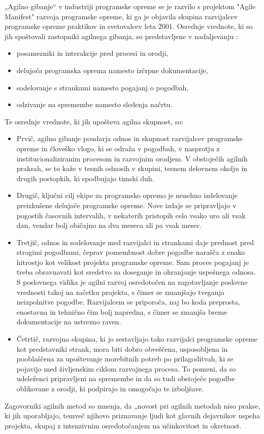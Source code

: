 \documentclass[a4paper,12pt,openright]{book}
\begin{document}
„Agilno gibanje“ v industriji programske opreme se je razvilo s projektom "Agile Manifest" razvoja programske opreme, ki ga je objavila skupina razvijalcev programske opreme praktikov in svetovalcev leta 2001. Osrednje vrednote, ki so jih spoštovali zastopniki agilnega gibanja, so predstavljene v nadaljevanju \cite{highsmith2009agile}:
\begin{itemize}
    \item posamezniki in interakcije pred procesi in orodji,
    \item delujoča programska oprema namesto izčrpne dokumentacije,
    \item sodelovanje s strankami namesto pogajanj o pogodbah,
    \item odzivanje na spremembe namesto sledenja načrtu.
\end{itemize}
Te osrednje vrednote, ki jih upošteva agilna skupnost, so:
\begin{itemize}
    \item Prvič, agilno gibanje poudarja odnos in skupnost razvijalcev programske opreme in človeško vlogo, ki se odraža v pogodbah, v nasprotju z institucionaliziranim procesom in razvojnim orodjem. V obstoječih agilnih praksah, se to kaže v tesnih odnosih v skupini, tesnem delovnem okolju in drugih postopkih, ki spodbujajo timski duh.
    \item Drugič, ključni cilj ekipe za programsko opremo je nenehno izdelovanje preizkušene delujoče programske opreme. Nove izdaje se pripravljajo v pogostih časovnih intervalih, v nekaterih pristopih celo vsako uro ali vsak dan, vendar bolj običajno na dva meseca ali pa vsak mesec. 
    \item Tretjič, odnos in sodelovanje med razvijalci in strankami daje prednost pred strogimi pogodbami, čeprav pomembnost dobre pogodbe narašča z enako hitrostjo kot velikost projekta programske opreme.
    Sam proces pogajanj je treba obravnavati kot sredstvo za doseganje in ohranjanje uspešnega odnosa. S poslovnega vidika je agilni razvoj osredotočen na zagotavljanje poslovne vrednosti takoj na začetku projekta, s čimer se zmanjšajo tveganja neizpolnitve pogodbe. Razvijalcem se priporoča, naj bo koda preprosta, enostavna in tehnično čim bolj napredna, s čimer se zmanjša breme dokumentacije na ustrezno raven.
    \item Četrtič, razvojna skupina, ki jo sestavljajo tako razvijalci programske opreme kot predstavniki strank, mora biti dobro obveščena, usposobljena in pooblaščena za upoštevanje morebitnih potreb po prilagoditvah, ki se pojavijo med življenskim ciklom razvojnega procesa. To pomeni, da so udeleženci pripravljeni na spremembe in da so tudi obstoječe pogodbe oblikovane z orodji, ki podpirajo in omogočajo te izboljšave.
\end{itemize}
Zagovorniki agilnih metod so mnenja, da „novost pri agilnih metodah niso prakse, ki jih uporabljajo, temveč njihovo priznavanje ljudi kot glavnih dejavnikov uspeha projekta, skupaj z intenzivnim osredotočanjem na učinkovitost in okretnost. 
\cite{DBLP:journals/corr/abs-1709-08439}
\end{document}
